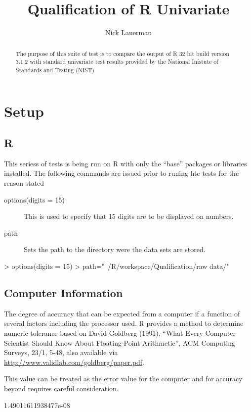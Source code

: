 \documentclass[10pt]{article}
\title{Qualification of R Univariate}
\author{Nick Lauerman}
\begin{document}

\maketitle

\begin{abstract}
The purpose of this suite of test is to compare the output of R 32 bit build
version 3.1.2 with standard univariate test results provided by the National
Inistute of Standards and Testing (NIST)
\end{abstract}

\tableofcontents

\section{Setup}
\subsection{R}
This seriess of tests is being run on R with only the ``base'' packages or libraries
installed. The following commands are issued prior to runing hte tests for the 
reason stated

\begin{description}
   \item[options(digits = 15)] This is used to specify that 15 digits are to be displayed
   on numbers.
   \item[path] Sets the path to the directory were the data sets are stored.
\end{description}
\begin{Schunk}
\begin{Sinput}
> options(digits = 15)
> path="~/R/workspace/Qualification/raw data/"
\end{Sinput}
\end{Schunk}
\subsection{Computer Information}

The degree of accuracy  that can be expected from a computer if a function of several
factors including the processor used. R provides a method to determine 
numeric tolerance based on David Goldberg (1991), 
``What Every Computer Scientist Should Know About Floating-Point Arithmetic'', 
ACM Computing Surveys, 23/1, 5-48, also available via 
\url{http://www.validlab.com/goldberg/paper.pdf}.

This value can be treated as the error value for the computer and for accuracy 
beyond requires careful consideration.
\begin{Schunk}
\begin{Soutput}
[1] 1.49011611938477e-08
\end{Soutput}
\end{Schunk}
\end{document}
